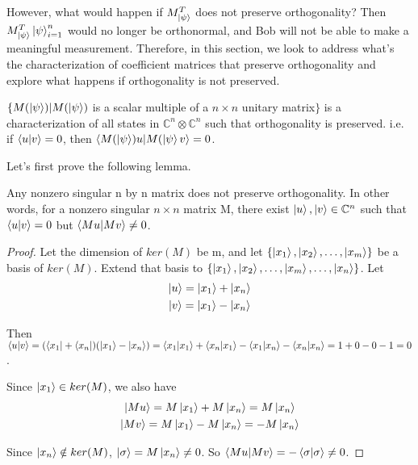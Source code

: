 However, what would happen if $M_{\ket{\psi}}^T$ does not preserve orthogonality? Then $M_{\ket{\psi}}^T \ket{\psi}_{i=1}^n$ would no longer be orthonormal, and Bob will not be able to make a meaningful measurement. Therefore, in this section, we look to address what's the characterization of coefficient matrices that preserve orthogonality and explore what happens if orthogonality is not preserved.

\begin{prop} \label{orthogonality preserving character}
$\{M(\ket{\psi})|M(\ket{\psi})$ is a scalar multiple of a $n \times n$ unitary matrix$\}$ is a characterization of all states in $\mathbb{C}^n \otimes \mathbb{C}^n$ such that orthogonality is preserved. i.e. if $\braket{u|v}=0$, then $\braket{M(\ket{\psi})u|M(\ket{\psi}v}=0$.
\end{prop}

Let's first prove the following lemma.

\begin{lemma}
Any nonzero singular n by n matrix does not preserve orthogonality. In other words, for a nonzero singular $n \times n$ matrix M, there exist $\ket{u}, \ket{v} \in \mathbb{C}^n$ such that $\braket{u|v}=0$ but $\braket{Mu|Mv} \ne 0$.
\end{lemma}

\begin{proof}

Let the dimension of $ker(M)$ be m, and let $\{\ket{x_1}, \ket{x_2},\hdots, \ket{x_m}\}$ be a basis of $ker(M)$. Extend that basis to $\{\ket{x_1}, \ket{x_2},\hdots, \ket{x_m}, \hdots, \ket{x_n}\}$. Let
\begin{gather*}
    \ket{u}=\ket{x_1}+\ket{x_n}\\
    \ket{v}=\ket{x_1}-\ket{x_n}
\end{gather*}

Then $\braket{u|v}=(\bra{x_1}+\bra{x_n})(\ket{x_1}-\ket{x_n})=\braket{x_1|x_1}+\braket{x_n|x_1}-\braket{x_1|x_n}-\braket{x_n|x_n}=1+0-0-1=0$.

Since $\ket{x_1} \in ker(M)$, we also have
\begin{gather*}
    \ket{Mu}=M\ket{x_1}+M\ket{x_n}=M\ket{x_n}\\
    \ket{Mv}=M\ket{x_1}-M\ket{x_n}=-M\ket{x_n}    
\end{gather*}

Since $\ket{x_n} \notin ker(M)$, $\ket{\sigma}=M\ket{x_n} \ne 0$. So $\braket{Mu|Mv}=-\braket{\sigma|\sigma} \ne 0$.
\end{proof}

